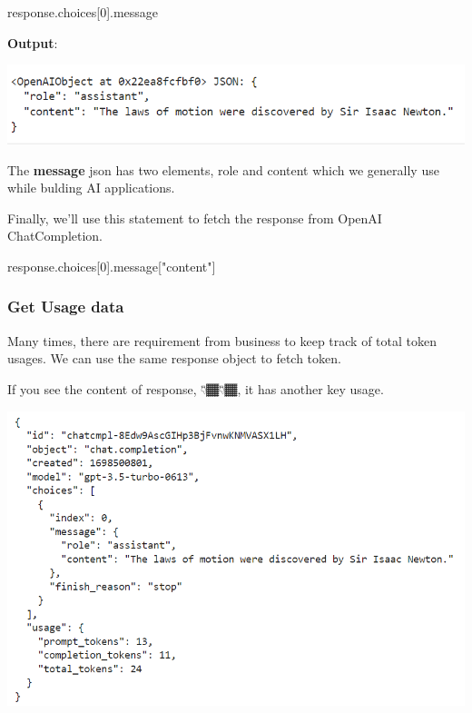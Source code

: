 \documentclass[
  letterpaper,
  DIV=11,
  numbers=noendperiod]{scrreprt}
\newenvironment{Shaded}{\begin{snugshade}}{\end{snugshade}}
\newcommand{\DecValTok}[1]{\textcolor[rgb]{0.68,0.00,0.00}{#1}}
\newcommand{\NormalTok}[1]{\textcolor[rgb]{0.00,0.23,0.31}{#1}}
\newcommand{\StringTok}[1]{\textcolor[rgb]{0.13,0.47,0.30}{#1}}
\begin{document}
\begin{Shaded}
\begin{Highlighting}[]
\NormalTok{response.choices[}\DecValTok{0}\NormalTok{].message}
\end{Highlighting}
\end{Shaded}

\textbf{Output}:

\includegraphics{images/ch2/2_3_response_object.png}

The \textbf{message} json has two elements, role and content which we
generally use while bulding AI applications.

Finally, we'll use this statement to fetch the response from OpenAI
ChatCompletion.

\begin{Shaded}
\begin{Highlighting}[]
\NormalTok{response.choices[}\DecValTok{0}\NormalTok{].message[}\StringTok{"content"}\NormalTok{]}
\end{Highlighting}
\end{Shaded}

\hypertarget{get-usage-data}{%
\subsubsection{Get Usage data}\label{get-usage-data}}

Many times, there are requirement from business to keep track of total
token usages. We can use the same response object to fetch token.

If you see the content of response, 👇🏾👇🏾, it has another key usage.

\includegraphics{images/ch2/2_response_object.png}
\end{document}
